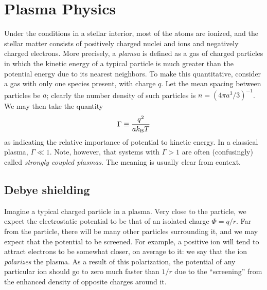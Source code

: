\chapter{Plasma Physics}

Under the conditions in a stellar interior, most of the atoms are ionized, and the stellar matter consists of positively charged nuclei and ions and negatively charged electrons. More precisely,
a \emph{plamsa} is defined as a gas of charged particles in which the kinetic energy of a typical particle is much greater than the potential energy due to its nearest neighbors. To make this quantitative, consider a gas with only one species present, with charge $q$.  Let the mean spacing between particles be $a$; clearly the number density of such particles is $n = (4\pi a^{3}/3)^{-1}$.  We may then take the quantity
\begin{equation}\label{e.Gamma-definition}
\Gamma \equiv \frac{q^{2}}{ak_\mathrm{B} T}
\end{equation}
as indicating the relative importance of potential to kinetic energy.  In a classical plasma, $\Gamma \ll 1$.  Note, however, that systems with $\Gamma > 1$ are often (confusingly) called  \emph{strongly coupled plasmas}. The meaning is usually clear from context.

\section{Debye shielding}\label{s.plasma-shielding}

Imagine a typical charged particle in a plasma.  Very close to the particle, we expect the electrostatic potential to be that of an isolated charge $\Phi = q/r$. Far from the particle, there will be many other particles surrounding it, and we may expect that the potential to be screened. For example, a positive ion will tend to attract electrons to be somewhat closer, on average to it: we say that the ion \emph{polarizes} the plasma.  As a result of this polarization, the potential of any particular ion should go to zero much faster than $1/r$ due to the ``screening'' from the enhanced density of opposite charges around it.

